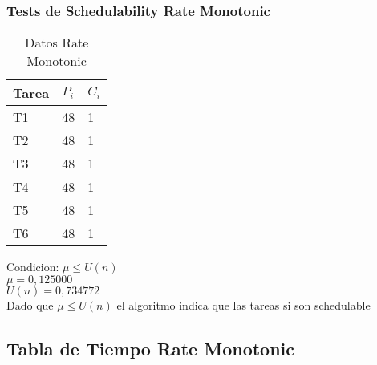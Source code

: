 \documentclass[xcolor=table]{beamer}
\begin{document}
\begin{frame} 
\frametitle{Tests de Schedulability  Rate Monotonic } 
\begin{table} 
\centering 
\begin{tabular}{|l|l|l|} 
\hline 
\cellcolor{lightgray}Tarea & \cellcolor{lightgray}$P_i$ & \cellcolor{lightgray}$C_i$ \\ \hline 
T1   & 48  &  1\\ \hline 
T2   & 48  &  1\\ \hline 
T3   & 48  &  1\\ \hline 
T4   & 48  &  1\\ \hline 
T5   & 48  &  1\\ \hline 
T6   & 48  &  1\\ \hline 
\end{tabular} 
\caption{Datos  Rate Monotonic } 
\end{table} 
Condicion: $\mu \leq U(n)$ \\ 
$\mu =  0,125000 $ \\ 
$U(n) =  0,734772 $ \\ 
Dado que $\mu \leq U(n)$ el algoritmo indica que las tareas si son schedulable \\ 
\end{frame} 

\subsection{Tabla de Tiempo  Rate Monotonic } 
\end{document}
